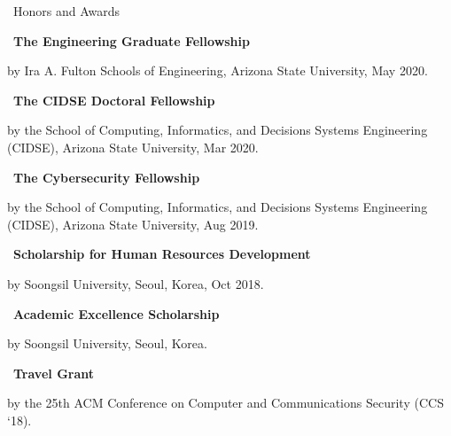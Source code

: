 \documentclass{resume} %
\begin{document}
\begin{rSection}{\faGenderless~Honors and Awards}
    \strut\textbullet~{\bf The Engineering Graduate Fellowship}\\
    \strut\hspace{1cm}\parbox[t]{\linegoal}{by Ira A. Fulton Schools of Engineering, Arizona State University, May 2020.}

    \strut\textbullet~{\bf The CIDSE Doctoral Fellowship}\\
    \strut\hspace{1cm}\parbox[t]{\linegoal}{by the School of Computing, Informatics, and Decisions Systems Engineering (CIDSE), Arizona State University, Mar 2020.}

    \strut\textbullet~{\bf The Cybersecurity Fellowship}\\
    \strut\hspace{1cm}\parbox[t]{\linegoal}{by the School of Computing, Informatics, and Decisions Systems Engineering (CIDSE), Arizona State University, Aug 2019.}

	\strut\textbullet~{\bf Scholarship for Human Resources Development}\\
	\strut\hspace{1cm}by Soongsil University, Seoul, Korea, Oct 2018.


	\strut\textbullet~{\bf Academic Excellence Scholarship}\\
	\strut\hspace{1cm}by Soongsil University, Seoul, Korea.

	\strut\textbullet~{\bf Travel Grant}\\
	\strut\hspace{1cm}by the 25th ACM Conference on Computer and Communications Security (CCS `18).

	\vspace{3mm}
\end{rSection}

\end{document}
